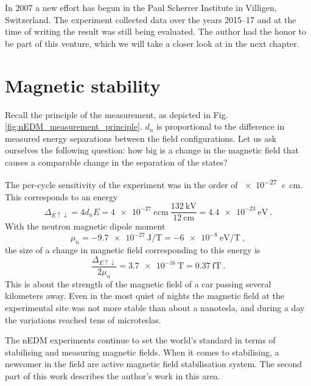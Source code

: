 In 2007 a new effort has begun in the Paul Scherrer Institute in Villigen, Switzerland. The experiment collected data over the years 2015--17 and at the time of writing the result was still being evaluated. The author had the honor to be part of this venture, which we will take a closer look at in the next chapter.



\section{Magnetic stability}
Recall the principle of the measurement, as depicted in Fig.\,\ref{fig:nEDM_measurement_principle}. $d_n$ is proportional to the difference in measured energy separations between the field configurations. Let us ask ourselves the following question: how big is a change in the magnetic field that causes a comparable change in the separation of the states?

The per-cycle sensitivity of the experiment was in the order of \SI{e-27}{\elementarycharge\centi\meter}. This corresponds to an energy
\begin{equation}
  \Delta_{E\uparrow\downarrow} = 4 d_n E = \SI{4e-27}{\elementarycharge\centi\meter} \ \frac{ \SI{132}{\kilo\volt} }{ \SI{12}{\centi\meter} } = \SI{4.4e-23}{\electronvolt} \ .
\end{equation}
With the neutron magnetic dipole moment
\begin{equation}
  \mu_n = \SI{-9.7e-27}{\joule\per\tesla} = \SI{-6e-8}{\electronvolt\per\tesla} \ ,
\end{equation}
the size of a change in magnetic field corresponding to this energy is
\begin{equation}
  \frac{ \Delta_{E\uparrow\downarrow} }{2 \mu_n} = \SI{3.7e-16}{\tesla} = \SI{0.37}{\femto\tesla} \ .
\end{equation}
This is about the strength of the magnetic field of a car passing several kilometers away. Even in the most quiet of nights the magnetic field at the experimental site was not more stable than about a nanotesla, and during a day the variations reached tens of microteslas.

The nEDM experiments continue to set the world's standard in terms of stabilising and measuring magnetic fields.
When it comes to stabilising, a newcomer in the field are active magnetic field stabilisation system. The second part of this work describes the author's work in this area.


